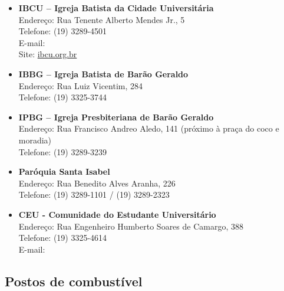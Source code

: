 \begin{itemize}
    \item   \textbf{IBCU -- Igreja Batista da Cidade Universitária}
        \\Endereço: Rua Tenente Alberto Mendes Jr., 5
        \\Telefone: (19) 3289-4501
        \\E-mail: 
        \\Site: \url{ibcu.org.br}

    \item   \textbf{IBBG -- Igreja Batista de Barão Geraldo}
        \\Endereço: Rua Luiz Vicentim, 284
        \\Telefone: (19) 3325-3744

    \item   \textbf{IPBG -- Igreja Presbiteriana de Barão Geraldo}
        \\Endereço: Rua Francisco Andreo Aledo, 141 (próximo à praça do coco e moradia)
        \\Telefone: (19) 3289-3239

    \item   \textbf{Paróquia Santa Isabel}
        \\Endereço: Rua Benedito Alves Aranha, 226
        \\Telefone: (19) 3289-1101 / (19) 3289-2323

    \item   \textbf{CEU - Comunidade do Estudante Universitário}
        \\Endereço: Rua Engenheiro Humberto Soares de Camargo, 388
        \\Telefone: (19) 3325-4614
        \\E-mail: 
\end{itemize}

\subsection{Postos de combustível}

